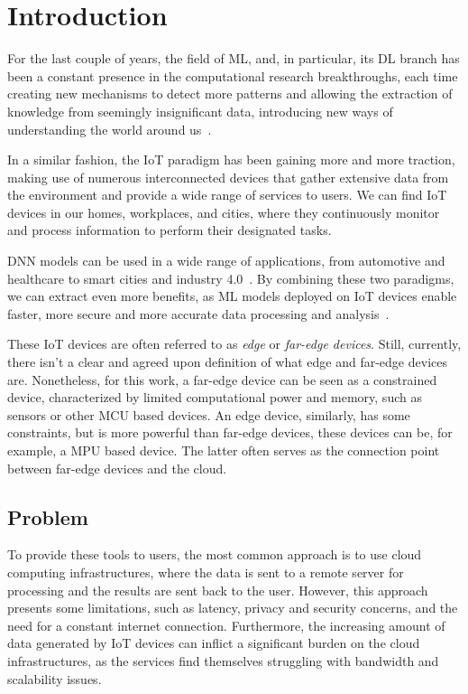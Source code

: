 \chapter{Introduction} \label{chap:intro}


For the last couple of years, the field of \ac{ML}, and, in 
particular, its \ac{DL} branch has been a constant presence in the 
computational research breakthroughs, each time creating new mechanisms to 
detect more patterns and allowing the extraction of knowledge from seemingly 
insignificant data, introducing new ways of understanding the world around us~\cite{tml-enabled-frugal-smart-objects}. 

In a similar fashion, the \ac{IoT} paradigm has been gaining more and more
traction, making use of numerous interconnected devices that gather 
extensive data from the environment and provide a wide range of 
services to users. We can find \ac{IoT} devices in our homes, workplaces, 
and cities, where they continuously monitor and process information to perform 
their designated tasks.

\ac{DNN} models can be used in a wide range of applications, from
automotive and healthcare to smart cities and industry 4.0~\cite{doyu::tinymlaas}.
By combining these two paradigms, we can extract even more benefits, as
\ac{ML} models deployed on \ac{IoT} devices enable faster, more
secure and more accurate data processing and analysis~\cite{david::tflm}.

These \ac{IoT} devices are often referred to as \textit{edge} or \textit{far-edge devices}. 
Still, currently, there isn't a clear and agreed upon definition of what edge and 
far-edge devices are. Nonetheless, for this work, a far-edge device can be seen
as a constrained device, characterized by limited computational power and
memory, such as sensors or other \ac{MCU} based devices. An edge device, similarly,
has some constraints, but is more powerful than far-edge devices,
these devices can be, for example, a \ac{MPU} based device. The latter
often serves as the connection point between far-edge devices and the cloud.

\section{Problem} \label{sec:problem}

To provide these tools to users, the most common approach is to
use cloud computing infrastructures, where the data is sent to a
remote server for processing and the results are sent back to the user.
However, this approach presents some limitations, such as latency, privacy
and security concerns, and the need for a constant internet connection.
Furthermore, the increasing amount of data generated by \ac{IoT} devices
can inflict a significant burden on the cloud infrastructures, as the
services find themselves struggling with bandwidth and scalability issues.

